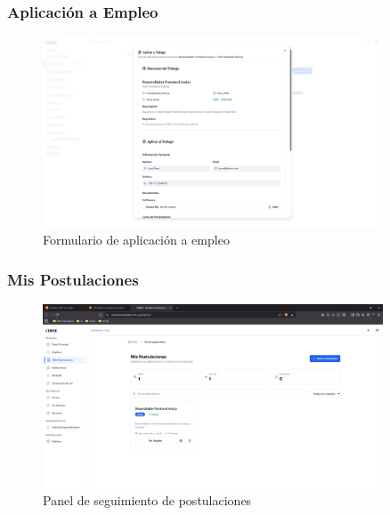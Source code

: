 \documentclass[12pt,a4paper]{article}
\begin{document}
\begin{enumerate}
\subsubsection{Aplicación a Empleo}
\begin{figure}[H]
    \centering
    \includegraphics[width=0.9\textwidth]{screenshots/youth/job-apply.png}
    \caption{Formulario de aplicación a empleo}
    \label{fig:youth-job-apply}
\end{figure}

\subsubsection{Mis Postulaciones}
\begin{figure}[H]
    \centering
    \includegraphics[width=0.9\textwidth]{screenshots/youth/my-applications.png}
    \caption{Panel de seguimiento de postulaciones}
    \label{fig:youth-applications}
\end{figure}


\end{enumerate}
\end{document}
